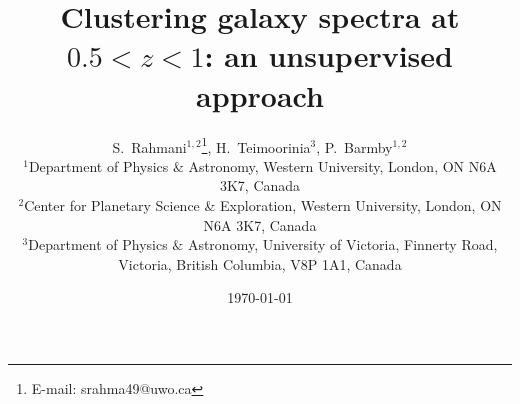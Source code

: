 \documentclass[useAMS,usenatbib]{mn2e}
\begin{document}

\title[SOM: classifying high $Z$ galaxies]{Clustering galaxy spectra at $0.5<z<1$: an unsupervised approach}
\date{\today}
\author[S.~Rahmani, H.~Teimoorinia and P.~Barmby]{S.~Rahmani$^{1,2}$\thanks{E-mail:
srahma49@uwo.ca}, H.~Teimoorinia$^{3}$, P.~Barmby$^{1,2}$\\
$^{1}$Department of Physics $\&$ Astronomy, Western University, London, ON N6A 3K7, Canada\\
$^{2}$Center for Planetary Science \& Exploration, Western University, London, ON N6A 3K7, Canada\\
$^{3}$Department of Physics $\&$ Astronomy, University of Victoria, Finnerty Road, Victoria, British Columbia, V8P 1A1, Canada}
\maketitle

\end{document}
